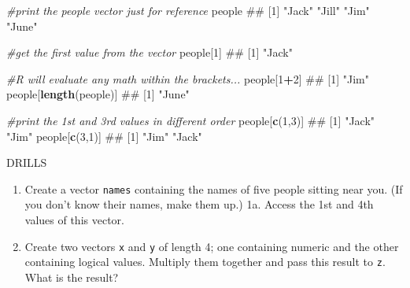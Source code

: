 \documentclass[ignorenonframetext,]{beamer}
\newenvironment{Shaded}{\begin{snugshade}}{\end{snugshade}}
\newcommand{\KeywordTok}[1]{\textcolor[rgb]{0.13,0.29,0.53}{\textbf{#1}}}
\newcommand{\DecValTok}[1]{\textcolor[rgb]{0.00,0.00,0.81}{#1}}
\newcommand{\CommentTok}[1]{\textcolor[rgb]{0.56,0.35,0.01}{\textit{#1}}}
\newcommand{\OperatorTok}[1]{\textcolor[rgb]{0.81,0.36,0.00}{\textbf{#1}}}
\newcommand{\NormalTok}[1]{#1}
\providecommand{\tightlist}{%
  \setlength{\itemsep}{0pt}\setlength{\parskip}{0pt}}
\begin{document}
\begin{frame}[fragile]

\begin{Shaded}
\begin{Highlighting}[]
\CommentTok{#print the people vector just for reference}
\NormalTok{people}
\NormalTok{## [1] "Jack" "Jill" "Jim"  "June"}
\end{Highlighting}
\end{Shaded}

\begin{Shaded}
\begin{Highlighting}[]
\CommentTok{#get the first value from the vector}
\NormalTok{people[}\DecValTok{1}\NormalTok{]}
\NormalTok{## [1] "Jack"}
\end{Highlighting}
\end{Shaded}

\begin{Shaded}
\begin{Highlighting}[]
\CommentTok{#R will evaluate any math within the brackets...}
\NormalTok{people[}\DecValTok{1}\OperatorTok{+}\DecValTok{2}\NormalTok{]}
\NormalTok{## [1] "Jim"}
\NormalTok{people[}\KeywordTok{length}\NormalTok{(people)]}
\NormalTok{## [1] "June"}
\end{Highlighting}
\end{Shaded}

\begin{Shaded}
\begin{Highlighting}[]
\CommentTok{#print the 1st and 3rd values in different order}
\NormalTok{people[}\KeywordTok{c}\NormalTok{(}\DecValTok{1}\NormalTok{,}\DecValTok{3}\NormalTok{)]}
\NormalTok{## [1] "Jack" "Jim"}
\NormalTok{people[}\KeywordTok{c}\NormalTok{(}\DecValTok{3}\NormalTok{,}\DecValTok{1}\NormalTok{)]}
\NormalTok{## [1] "Jim"  "Jack"}
\end{Highlighting}
\end{Shaded}

\end{frame}

\begin{frame}[fragile]{DRILLS}

\begin{enumerate}[<+->]
\def\labelenumi{\arabic{enumi}.}
\tightlist
\item
  Create a vector \texttt{names} containing the names of five people
  sitting near you. (If you don't know their names, make them up.) 1a.
  Access the 1st and 4th values of this vector.
\item
  Create two vectors \texttt{x} and \texttt{y} of length 4; one
  containing numeric and the other containing logical values. Multiply
  them together and pass this result to \texttt{z}. What is the result?
\end{enumerate}

\end{frame}
\end{document}
